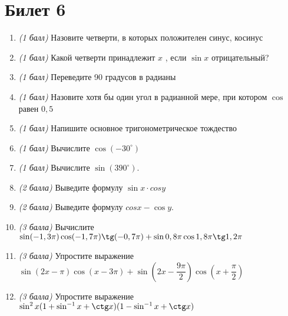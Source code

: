 \documentclass[12pt, a4paper]{article}
\begin{document}
	\section*{Билет 6}
	\begin{enumerate}
		\item \textit{(1 балл)}	Назовите четверти, в которых положителен синус, косинус 
		\item \textit{(1 балл)}	Какой четверти принадлежит $x$ , если $\sin x$ отрицательный?
		\item \textit{(1 балл)}	Переведите 90 градусов в радианы
		\item \textit{(1 балл)}	Назовите хотя бы один угол в радианной мере, при котором $\cos$  равен $0,5$
		\item \textit{(1 балл)} Напишите основное тригонометрическое тождество
		\item \textit{(1 балл)} Вычислите $\cos (-30^{\circ})$
		\item \textit{(1 балл)}	Вычислите $\sin (390^{\circ})$.
		\item \textit{(2 балла)} Выведите формулу $\sin x \cdot cos y$ 
		\item \textit{(2 балла)} Выведите формулу $cos x - \cos y$.
		\item \textit{(3 балла)} Вычислите $\sin(-1,3\pi) \cos (-1,7 \pi) \tg (-0,7 \pi)+ \sin 0,8 \pi \cos 1,8 \pi \tg 1,2 \pi$
		\item \textit{(3 балла)} Упростите выражение $\sin(2x-\pi) \cos (x-3\pi) + \sin (2x- \dfrac{9 \pi}{2}) \cos (x+\dfrac{\pi}{2})$
		\item \textit{(3 балла)} Упростите выражение $\sin^2 x(1+\sin^{-1}x + \ctg x)(1 - \sin^{-1}x + \ctg x)$
	\end{enumerate}
	
	\newpage 
	
\end{document}
